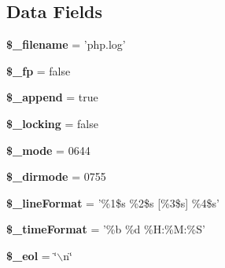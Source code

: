 \subsection*{Data Fields}
\begin{DoxyCompactItemize}
\item 
\hypertarget{class_log__file_a6e6ee3a8ca2b0f9123ccd3690cc9b52e}{
{\bfseries \$\_\-filename} = 'php.log'}
\label{class_log__file_a6e6ee3a8ca2b0f9123ccd3690cc9b52e}

\item 
\hypertarget{class_log__file_a9ffe98ce26fe35e7a653fc672b8e0521}{
{\bfseries \$\_\-fp} = false}
\label{class_log__file_a9ffe98ce26fe35e7a653fc672b8e0521}

\item 
\hypertarget{class_log__file_a2d2c42cbfacf0c78042a12483f734d98}{
{\bfseries \$\_\-append} = true}
\label{class_log__file_a2d2c42cbfacf0c78042a12483f734d98}

\item 
\hypertarget{class_log__file_a244936b413a1cd5f8a86a382e44871dc}{
{\bfseries \$\_\-locking} = false}
\label{class_log__file_a244936b413a1cd5f8a86a382e44871dc}

\item 
\hypertarget{class_log__file_a591b2fac857402b7049ebb2ca47cdd34}{
{\bfseries \$\_\-mode} = 0644}
\label{class_log__file_a591b2fac857402b7049ebb2ca47cdd34}

\item 
\hypertarget{class_log__file_a8e649fcc616f8c068a3c000cf66f21db}{
{\bfseries \$\_\-dirmode} = 0755}
\label{class_log__file_a8e649fcc616f8c068a3c000cf66f21db}

\item 
\hypertarget{class_log__file_a987ec493419026385e852e1fbbc68543}{
{\bfseries \$\_\-lineFormat} = '\%1\$s \%2\$s \mbox{[}\%3\$s\mbox{]} \%4\$s'}
\label{class_log__file_a987ec493419026385e852e1fbbc68543}

\item 
\hypertarget{class_log__file_a7b5dae11e5c85b90db946240cb9d4e42}{
{\bfseries \$\_\-timeFormat} = '\%b \%d \%H:\%M:\%S'}
\label{class_log__file_a7b5dae11e5c85b90db946240cb9d4e42}

\item 
\hypertarget{class_log__file_ab8a72d3e3d70a99f7cc7a6c0838c0638}{
{\bfseries \$\_\-eol} = \char`\"{}$\backslash$n\char`\"{}}
\label{class_log__file_ab8a72d3e3d70a99f7cc7a6c0838c0638}

\end{DoxyCompactItemize}


